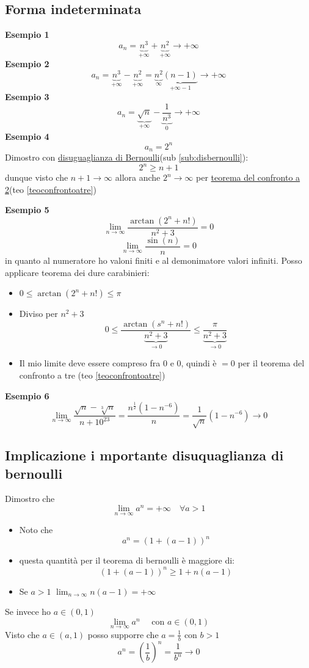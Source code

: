 \subsection{Forma indeterminata}
\textbf{Esempio 1}
\[
a_n = \underbrace{n^3}_{+ \infty} + \underbrace{n^2}_{+\infty} \to + \infty
\] 
\textbf{Esempio 2}
\[
a_n = \underbrace{n^3}_{+ \infty} -  \underbrace{n^2}_{+\infty} = \underbrace{n^2}_{\infty} \underbrace{\left( n-1 \right)}_{+\infty-1}  \to + \infty
\] 
\textbf{Esempio 3}
\[
a_n= \underbrace{\sqrt{n}}_{+\infty} - \underbrace{\frac{1}{n^3}}_{0} \to + \infty
\]
\textbf{Esempio 4}
\[
a_n = 2^{n}
\] 
Dimostro con \underline{disuguaglianza di Bernoulli}(sub \ref{sub:disbernoulli}):
\[
2^{n} \ge n+1
\] 
dunque visto che $ n+1 \to \infty$ allora anche $2^{n} \to \infty$ per \underline{teorema del confronto a 2}(teo \ref{teoconfrontoatre})

\textbf{Esempio 5} 
\[
\lim_{n \to \infty} \frac{\arctan \left( 2^{n} + n! \right) }{n^2 + 3} = 0
\] 
\[
\lim_{n \to \infty} \frac{\sin\left( n \right)}{n}  = 0
\] 
in quanto al numeratore ho valoni finiti e al demonimatore valori infiniti. Posso applicare teorema dei dure carabinieri:
\begin{itemize}
	\item $0 \le \arctan \left( 2^{n} + n! \right) \le \pi$
	\item Diviso per $ n^2 + 3$
	\[
	0 \le \frac{\arctan \left( s^{n} + n! \right) } {\underbrace{n^2 + 3}_{\to 0}} \le \frac{\pi}{\underbrace{n^2 + 3}_{\to 0}}
	\]
	\item Il mio limite deve essere compreso fra $0$ e $0$, quindi è $=0$ per il teorema del confronto a tre (teo \ref{teoconfrontoatre})
\end{itemize}
\textbf{Esempio 6}
\[
\lim_{n \to \infty} \frac{\sqrt{n} - \sqrt[3] {n} }{n + 10^{23}} = \frac{n^{\frac{1}{2}}\left( 1- n^{-6} \right)}{n}  = \frac{1}{\sqrt{n} }\left( 1-n^{-6} \right) \to 0
\] 
\subsection{Implicazione i mportante disuquaglianza di bernoulli}
Dimostro che 
\[
\lim_{n \to \infty} a ^{ n} = + \infty \quad \forall a > 1
\] 
\begin{itemize}
	\item Noto che 
	\[
	a^{n}= \left( 1 + \left(  a-1 \right)  \right) ^{n}
	\] 
	\item questa quantità per il teorema di bernoulli è maggiore di:
	\[
	\left( 1 + \left( a-1 \right)  \right) ^{n} \ge 1 + n\left( a-1 \right) 
	\] 
	\item Se $a > 1$ $\lim_{n \to \infty} n\left( a-1 \right) = + \infty $
\end{itemize}
Se invece ho $a \in  \left( 0,1 \right) $
\[
\lim_{n \to \infty} a^{n} \quad \text{  con  }a \in  \left( 0,1 \right)  
\]
Visto che $a \in  \left( a,1 \right) $ posso supporre che $a=\frac{1}{b}$ con $b > 1$
\[
a^{n} = \left( \frac{1}{b} \right) ^{n} = \frac{1}{b^{n}} \to 0
\] 
